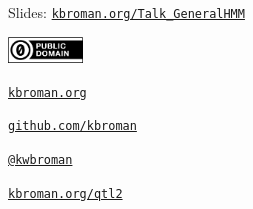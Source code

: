 \documentclass[aspectratio=169,12pt,t]{beamer}
\begin{document}
\begin{frame}[c]{}

\Large

Slides: \href{https://kbroman.org/Talk_GeneralHMM}{\tt kbroman.org/Talk\_GeneralHMM}

\vspace*{-7mm}
\hfill
\href{https://creativecommons.org/publicdomain/zero/1.0/}{\includegraphics[height=7mm]{Figs/cc-zero.png}}

\vspace{4mm}

\href{https://kbroman.org}{\tt \lolit kbroman.org}

\vspace{5mm}

\href{https://github.com/kbroman}{\tt \lolit github.com/kbroman}

\vspace{5mm}

\href{https://twitter.com/kwbroman}{\tt \lolit @kwbroman}

\vspace{5mm}

\href{https://kbroman.org/qtl2}{\tt \lolit kbroman.org/qtl2}



\end{frame}
\end{document}
